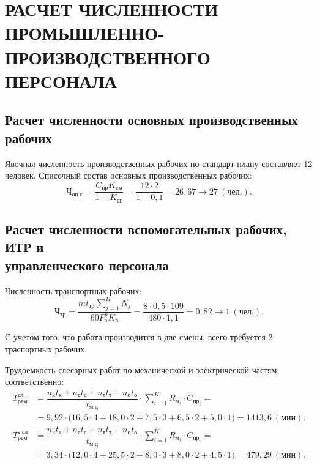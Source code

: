 \section[
Расчет численности промышленно-производственного персонала]{
РАСЧЕТ ЧИСЛЕННОСТИ \\
ПРОМЫШЛЕННО-ПРОИЗВОДСТВЕННОГО \\
ПЕРСОНАЛА
}
\label{sec:number}

\subsection[
Расчет численности основных производственных рабочих
]{
Расчет численности основных производственных рабочих
}

Явочная численность производственных рабочих по стандарт-плану
составляет 12 человек.
Списочный состав основных производственных рабочих:
\begin{equation*}
  \text{Ч}_{\text{оп.с}} = 
    \dfrac{C_{\text{пр}}K_{см}}{1-K_{\text{сп}}} =
    \dfrac{12 \cdot 2}{1-0{,}1} =
    26{,}67 \rightarrow 27 \: (\text{чел.}).
\end{equation*}

\subsection[
Расчет численности вспомогательных рабочих, ИТР и \\
управленческого персонала
]{
Расчет численности вспомогательных рабочих, ИТР и \\
управленческого персонала
}

Численность транспортных рабочих:
\begin{equation*}
  \text{Ч}_{\text{тр}} = 
  \dfrac{m t_{\text{тр}} \sum^H_{j=1} N_j}{60 F^p_{\text{э}} K_{\text{в}}} =
  \dfrac{8 \cdot 0{,}5 \cdot 109}{480 \cdot 1{,}1} =
  0{,}82 \rightarrow 1 \: (\text{чел.}).
\end{equation*}

С учетом того, что работа производится в две смены, 
всего требуется 2 траспортных рабочих.

Трудоемкость слесарных работ по механической и электрической частям соответственно:
{\small
\begin{align*}
  T^{\text{сл}}_{\text{рем}} &= 
  \dfrac{
    n_{\text{к}}t_{\text{к}} + n_{\text{с}}t_{\text{с}} +
    n_{\text{т}}t_{\text{т}} + n_{\text{о}}t_{\text{о}}
  }{
    t_{\text{м.ц}}
  } \cdot \sum^K_{i=1} R_{\text{м}_i} \cdot C_{\text{пр}_i} = \\
  &= 9{,}92
    \cdot
    \big(
      16{,}5 \cdot 4 + 18{,}0 \cdot 2 + 7{,}5 \cdot 3 + 
      6{,}5 \cdot 2 + 5{,}0 \cdot 1
    \big) =
    1413{,}6 \: (\text{мин}). 
  \\
  T^{\text{э.сл}}_{\text{рем}} &= 
  \dfrac{
    n_{\text{к}}t_{\text{к}} + n_{\text{с}}t_{\text{с}} +
    n_{\text{т}}t_{\text{т}} + n_{\text{о}}t_{\text{о}}
  }{
    t_{\text{м.ц}}
  } \cdot \sum^K_{i=1} R_{\text{м}_i} \cdot C_{\text{пр}_i} = \\
  &= 3{,}34
    \cdot
    \big(
      12{,}0 \cdot 4 + 25{,}5 \cdot 2 + 8{,}0 \cdot 3 + 
      8{,}0 \cdot 2 + 4{,}5 \cdot 1
    \big) =
    479{,}29 \: (\text{мин}).
\end{align*}
}

